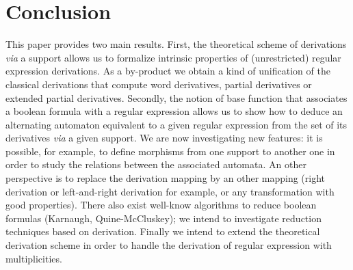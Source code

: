 \documentclass{article}
\begin{document}
\section{Conclusion}
This paper provides two main results.
First, the theoretical scheme of derivations {\it via} a support 
allows us to formalize intrinsic properties of (unrestricted) regular expression derivations.
As a by-product we obtain a kind of unification of the classical derivations that
compute word derivatives, partial derivatives or extended partial derivatives. 
Secondly, the notion of base function that associates a boolean formula with a regular expression
allows us to show how to deduce an alternating automaton equivalent to a given regular expression
from the set of its derivatives {\it via} a given support.
We are now investigating new features: it is possible, for example,
to define morphisms from one support to another one
in order to study the relations between the associated automata.
An other perspective is to replace the derivation mapping by an other mapping (right derivation
or left-and-right derivation for example, or any transformation with good properties).
There also exist well-know algorithms to reduce boolean formulas (Karnaugh, Quine-McCluskey);
we intend to investigate reduction techniques based on derivation.
Finally we intend to extend the theoretical derivation scheme in order to handle the derivation of regular expression 
with multiplicities.
 

  
    
\end{document}
